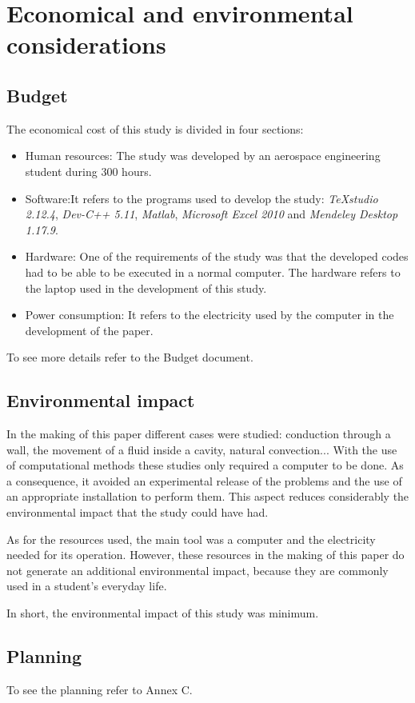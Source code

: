 \chapter{Economical and environmental considerations}

\section{Budget}
The economical cost of this study is divided in four sections:
\begin{itemize}
	\item Human resources: The study was developed by an aerospace engineering student during 300 hours.
	\item Software:It refers to the programs used to develop the study: \textit{TeXstudio 2.12.4}, \textit{Dev-C++ 5.11}, \textit{Matlab}, \textit{Microsoft Excel 2010} and \textit{Mendeley Desktop 1.17.9}.
	\item Hardware: One of the requirements of the study was that the developed codes had to be able to be executed in a normal computer. The hardware refers to the laptop used in the development of this study.
	\item Power consumption: It refers to the electricity used by the computer in the development of the paper.
\end{itemize}
To see more details refer to the Budget document.


\section{Environmental impact}
In the making of this paper different cases were studied: conduction through a wall, the movement of a fluid inside a cavity, natural convection... With the use of computational methods these studies only required a computer to be done. As a consequence, it avoided an experimental release of the problems and the use of an appropriate installation to perform them. This aspect reduces considerably the environmental impact that the study could have had.

As for the resources used, the main tool was a computer and the electricity needed for its operation. However, these resources in the making of this paper do not generate an additional environmental impact, because they are commonly used in a student's everyday life.

In short, the environmental impact of this study was minimum.

\section{Planning}
To see the planning refer to Annex C.